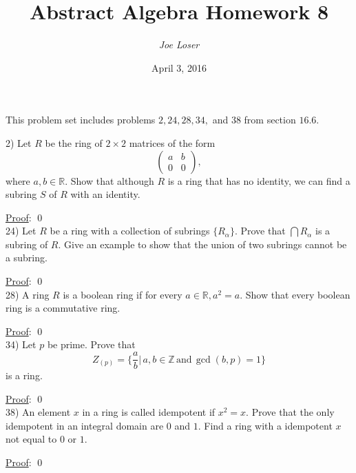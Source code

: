 \documentclass{article}
\title{Abstract Algebra Homework 8}
\author{\textit{Joe Loser}}
\date{April 3, 2016}
\begin{document}
\maketitle

This problem set includes problems $2, 24, 28, 34,$ and $38$ from section $16.6$.

2) Let $R$ be the ring of $2 \times 2$ matrices of the form
$$ \begin{pmatrix}
	a & b \\
	0 & 0
\end{pmatrix},$$ 
where $a, b \in \mathbb{R}$. Show that although $R$ is a ring that has no identity, we can find a subring $S$ of $R$ with an identity.

\underline{Proof}: \qed \\

24) Let $R$ be a ring with a collection of subrings $\{R_{\alpha}\}$. Prove that $\bigcap R_{\alpha}$ is a subring of $R$. Give an example to show that the union of two subrings cannot be a subring.

\underline{Proof}: \qed \\

28) A ring $R$ is a boolean ring if for every $a \in \mathbb{R}, a^2 = a$. Show that every boolean ring is a commutative ring.

\underline{Proof}: \qed \\

34) Let $p$ be prime. Prove that
$$Z_{(p)} = \big\{ \frac{a}{b} \big\vert \, a, b \in \mathbb{Z} \, \text{and} \, \gcd(b, p) = 1 \big\} $$
is a ring. 

\underline{Proof}: \qed \\

38) An element $x$ in a ring is called idempotent if $x^2 = x$. Prove that the only idempotent in an integral domain are $0$ and $1$. Find a ring with a idempotent $x$ not equal to $0$ or $1$. 

\underline{Proof}: \qed \\
\end{document}
